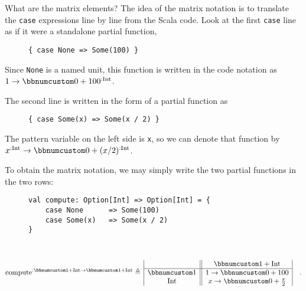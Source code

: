 What are the matrix elements? The idea of the matrix notation is to
translate the \lstinline!case! expressions line by line from the
Scala code. Look at the first \lstinline!case! line as if it were
a standalone partial function,

\begin{wrapfigure}{l}{0.45\columnwidth}%
\vspace{-0.85\baselineskip}
\begin{lstlisting}
{ case None => Some(100) }
\end{lstlisting}

\vspace{-0.75\baselineskip}
\end{wrapfigure}%

\noindent Since \lstinline!None! is a named unit, this function is
written in the code notation as $1\rightarrow\bbnum 0+100^{:\text{Int}}$. 

The second line is written in the form of a partial function as

\begin{wrapfigure}{l}{0.45\columnwidth}%
\vspace{-0.85\baselineskip}
\begin{lstlisting}
{ case Some(x) => Some(x / 2) }
\end{lstlisting}

\vspace{-0.75\baselineskip}
\end{wrapfigure}%

\noindent The pattern variable on the left side is \lstinline!x!,
so we can denote that function by $x^{:\text{Int}}\rightarrow\bbnum 0+(x/2)^{:\text{Int}}$. 

To obtain the matrix notation, we may simply write the two partial
functions in the two rows:

\begin{wrapfigure}{l}{0.45\columnwidth}%
\vspace{-0.85\baselineskip}
\begin{lstlisting}
val compute: Option[Int] => Option[Int] = {
    case None      => Some(100)
    case Some(x)   => Some(x / 2)
}
\end{lstlisting}

\vspace{-0.75\baselineskip}
\end{wrapfigure}%

~\vspace{-1.35\baselineskip}
\[
\text{compute}^{:\bbnum 1+\text{Int}\rightarrow\bbnum 1+\text{Int}}\triangleq\,\begin{array}{|c||c|}
 & \bbnum 1+\text{Int}\\
\hline \bbnum 1 & 1\rightarrow\bbnum 0+100\\
\text{Int} & x\rightarrow\bbnum 0+\frac{x}{2}
\end{array}\quad.
\]
\vspace{-0.9\baselineskip}

